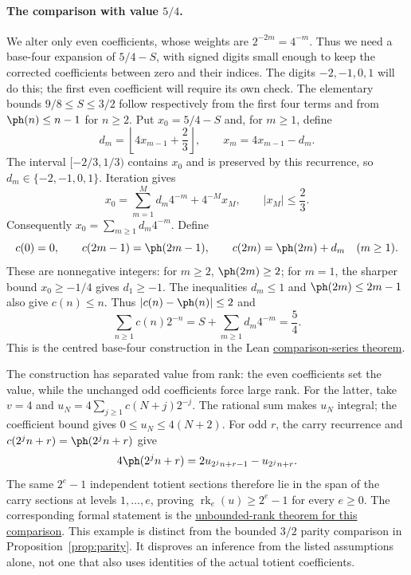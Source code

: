 \paragraph{The comparison with value $5/4$.}
We alter only even coefficients, whose weights are
$2^{-2m}=4^{-m}$. Thus we need a base-four expansion of $5/4-S$,
with signed digits small enough to keep the corrected coefficients
between zero and their indices. The digits $-2,-1,0,1$ will do this;
the first even coefficient will require its own check.
The elementary bounds $9/8\le S\le3/2$ follow respectively from the
first four terms and from $\ph(n)\le n-1$ for $n\ge2$.
Put $x_0=5/4-S$ and, for $m\ge1$, define
\[
 d_m=\left\lfloor4x_{m-1}+\frac23\right\rfloor,
 \qquad x_m=4x_{m-1}-d_m.
\]
The interval $[-2/3,1/3)$ contains $x_0$ and is preserved by this
recurrence, so $d_m\in\{-2,-1,0,1\}$. Iteration gives
\[
 x_0=\sum_{m=1}^{M}d_m4^{-m}+4^{-M}x_M,
 \qquad |x_M|\le\frac23.
\]
Consequently $x_0=\sum_{m\ge1}d_m4^{-m}$. Define
\[
 c(0)=0,\qquad c(2m-1)=\ph(2m-1),\qquad
 c(2m)=\ph(2m)+d_m\quad(m\ge1).
\]
These are nonnegative integers: for $m\ge2$, $\ph(2m)\ge2$;
for $m=1$, the sharper bound $x_0\ge-1/4$ gives $d_1\ge-1$.
The inequalities $d_m\le1$ and $\ph(2m)\le2m-1$ also give $c(n)\le n$.
Thus $|c(n)-\ph(n)|\le2$ and
\[
 \sum_{n\ge1}c(n)2^{-n}=S+\sum_{m\ge1}d_m4^{-m}=\frac54.
\]
This is the centred base-four construction in the Lean
\href{https://github.com/wcook04/plectis-erdos-lean/blob/52f29ad173b04e3bac941b3663f2b9aebe5de0bb/ErdosProblems/Erdos249/ParityPerturbedRationalControl.lean#L379}{comparison-series theorem}.

The construction has separated value from rank: the even coefficients
set the value, while the unchanged odd coefficients force large rank.
For the latter, take $v=4$ and
$u_N=4\sum_{j\ge1}c(N+j)2^{-j}$. The rational sum makes $u_N$ integral;
the coefficient bound gives $0\le u_N\le4(N+2)$. For odd $r$, the
carry recurrence and $c(2^jn+r)=\ph(2^jn+r)$ give
\[
 4\ph(2^j n+r)=2u_{2^j n+r-1}-u_{2^j n+r}.
\]
The same $2^e-1$ independent totient sections therefore lie in the
span of the carry sections at levels $1,\ldots,e$, proving
$\operatorname{rk}_e(u)\ge2^e-1$ for every $e\ge0$.
The corresponding formal statement is the
\href{https://github.com/wcook04/plectis-erdos-lean/blob/52f29ad173b04e3bac941b3663f2b9aebe5de0bb/ErdosProblems/Erdos249/ParityPerturbedRationalControl.lean#L478}{unbounded-rank theorem for this comparison}.
This example is distinct from the bounded $3/2$ parity comparison in
Proposition~\ref{prop:parity}. It disproves an inference from the listed
assumptions alone, not one that also uses identities of the actual
totient coefficients.

